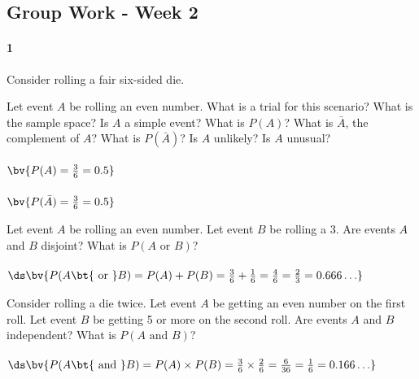 \documentclass{article}
\begin{document}
\begin{flushleft}
\section*{Group Work - Week 2}
\paragraph{1} Consider rolling a fair six-sided die.
\begin{enumalpha}
\item Let event $A$ be rolling an even number. What is a trial for this scenario? What is the sample space? Is $A$ a simple event? What is $P(A)$? What is $\bar A$, the complement of $A$? What is $P(\bar A)$? Is $A$ unlikely? Is $A$ unusual?\\
\medskip
{}\\
$\bv{ P(A) = \frac 3 6 = 0.5}$\\
\\
$\bv{ P(\bar A) = \frac 3 6 = 0.5}$\\

\vspace{.5in}
\item Let event $A$ be rolling an even number. Let event $B$ be rolling a 3. Are events $A$ and $B$ disjoint? What is $P(A \text{ or } B)$?\\
\medskip
{}\\
\medskip $\ds \bv{P(A \text{\bt{ or }} B) = P(A) + P(B) =  \frac 3 6 + \frac 1 6 = \frac 4 6 = \frac 2 3 = 0.666\ldots}$
\vspace{.5in}
\item Consider rolling a die twice. Let event $A$ be getting an even number on the first roll. Let event $B$ be getting 5 or more on the second roll. Are events $A$ and $B$ independent? What is $P(A \text { and } B)$?\\
\medskip
{}\\
\medskip $\ds \bv{P(A \text{\bt{ and }} B) = P(A) \times P(B) = \frac 3 6 \times \frac 2 6 = \frac {6}{36} = \frac 1 6 = 0.166\ldots}$
\end{enumalpha}


\end{flushleft}
\end{document}
